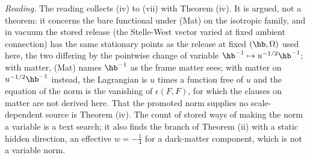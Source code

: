 \emph{Reading.} The reading collects (iv) to (vii) with Theorem (iv). It is argued, not a theorem: it concerns the bare functional under (Mat) on the isotropic family, and in vacuum the stored release (the Stelle-West vector varied at fixed ambient connection) has the same stationary points as the release at fixed $(\hb, \Omega)$ used here, the two differing by the pointwise change of variable $\hb^{-1} \mapsto u^{-1/2}\hb^{-1}$; with matter, (Mat) names $\hb^{-1}$ as the frame matter sees; with matter on $u^{-1/2}\hb^{-1}$ instead, the Lagrangian is $u$ times a function free of $u$ and the equation of the norm is the vanishing of $\epsilon(F, F)$, for which the clauses on matter are not derived here. That the promoted norm supplies no scale-dependent source is Theorem (iv). The count of stored ways of making the norm a variable is a text search; it also finds the branch of Theorem (ii) with a static hidden direction, an effective $w = -\tfrac14$ for a dark-matter component, which is not a variable norm.
